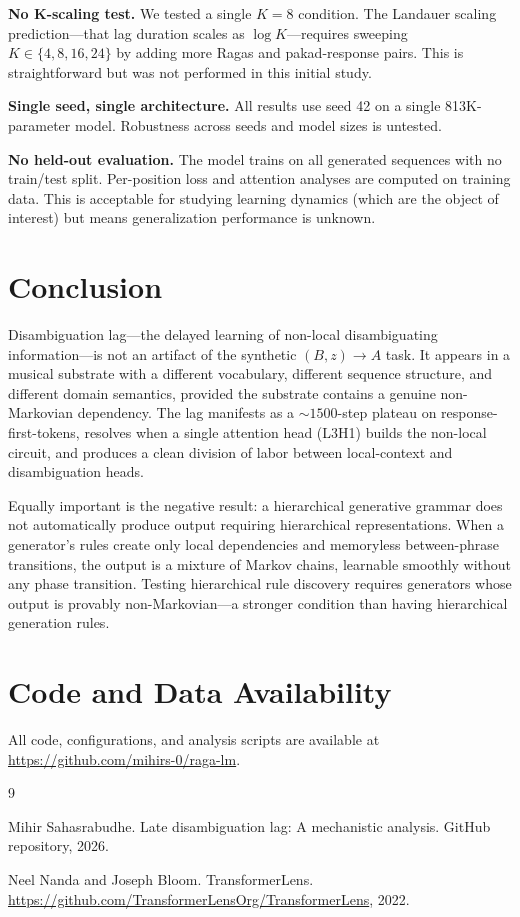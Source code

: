 \documentclass[11pt,a4paper]{article}
\begin{document}
\textbf{No K-scaling test.} We tested a single $K = 8$ condition. The Landauer scaling prediction---that lag duration scales as $\log K$---requires sweeping $K \in \{4, 8, 16, 24\}$ by adding more Ragas and pakad-response pairs. This is straightforward but was not performed in this initial study.

\textbf{Single seed, single architecture.} All results use seed 42 on a single 813K-parameter model. Robustness across seeds and model sizes is untested.

\textbf{No held-out evaluation.} The model trains on all generated sequences with no train/test split. Per-position loss and attention analyses are computed on training data. This is acceptable for studying learning dynamics (which are the object of interest) but means generalization performance is unknown.

\section{Conclusion}

Disambiguation lag---the delayed learning of non-local disambiguating information---is not an artifact of the synthetic $(B, z) \to A$ task. It appears in a musical substrate with a different vocabulary, different sequence structure, and different domain semantics, provided the substrate contains a genuine non-Markovian dependency. The lag manifests as a ${\sim}1500$-step plateau on response-first-tokens, resolves when a single attention head (L3H1) builds the non-local circuit, and produces a clean division of labor between local-context and disambiguation heads.

Equally important is the negative result: a hierarchical generative grammar does not automatically produce output requiring hierarchical representations. When a generator's rules create only local dependencies and memoryless between-phrase transitions, the output is a mixture of Markov chains, learnable smoothly without any phase transition. Testing hierarchical rule discovery requires generators whose output is provably non-Markovian---a stronger condition than having hierarchical generation rules.

\section*{Code and Data Availability}

All code, configurations, and analysis scripts are available at \url{https://github.com/mihirs-0/raga-lm}.


\begin{thebibliography}{9}

Mihir Sahasrabudhe.
\newblock Late disambiguation lag: A mechanistic analysis.
\newblock GitHub repository, 2026.

Neel Nanda and Joseph Bloom.
\newblock TransformerLens.
\newblock \url{https://github.com/TransformerLensOrg/TransformerLens}, 2022.

\end{thebibliography}
\end{document}
